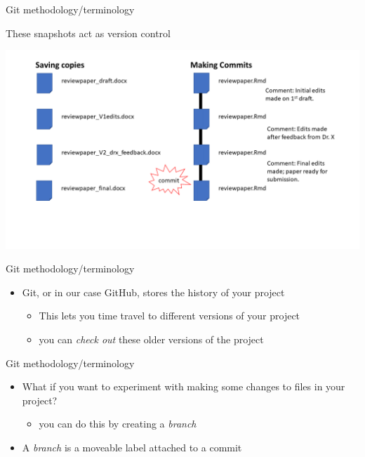 \documentclass[
  ignorenonframetext,
]{beamer}
\providecommand{\tightlist}{%
  \setlength{\itemsep}{0pt}\setlength{\parskip}{0pt}}
\begin{document}
\begin{frame}{Git methodology/terminology}
\protect\hypertarget{git-methodologyterminology-3}{}

These snapshots act as version control

\includegraphics{pres_figs/copies_commits3.png}

\end{frame}

\begin{frame}{Git methodology/terminology}
\protect\hypertarget{git-methodologyterminology-4}{}

\begin{itemize}
\tightlist
\item
  Git, or in our case GitHub, stores the history of your project

  \begin{itemize}
  \tightlist
  \item
    This lets you time travel to different versions of your project
  \item
    you can \emph{check out} these older versions of the project
  \end{itemize}
\end{itemize}

\end{frame}

\begin{frame}{Git methodology/terminology}
\protect\hypertarget{git-methodologyterminology-5}{}

\begin{itemize}
\tightlist
\item
  What if you want to experiment with making some changes to files in
  your project?

  \begin{itemize}
  \tightlist
  \item
    you can do this by creating a \emph{branch}
  \end{itemize}
\item
  A \emph{branch} is a moveable label attached to a commit
\end{itemize}

\end{frame}
\end{document}
